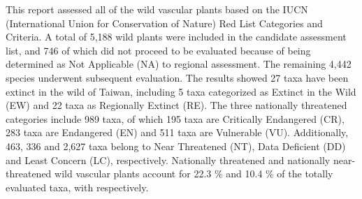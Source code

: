 
This report assessed all of the wild vascular plants based on the
IUCN (International Union for Conservation of Nature) Red List Categories and Criteria.
A total of 5,188 wild plants were included in the candidate assessment list,
and 746 of which did not proceed to be evaluated because of being determined 
as Not Applicable (NA) to regional assessment. The remaining 4,442 species underwent 
subsequent evaluation. The results showed 27 taxa have been extinct in the wild of Taiwan,
including 5 taxa categorized as Extinct in the Wild (EW) and 22 taxa as 
Regionally Extinct (RE). The three nationally threatened categories include 989 taxa, 
of which 195 taxa are Critically Endangered (CR), 283 taxa are Endangered (EN) 
and 511 taxa are Vulnerable (VU). Additionally, 463, 336 and 2,627 taxa belong to Near Threatened (NT), 
Data Deficient (DD) and Least Concern (LC), respectively. Nationally 
threatened and nationally near-threatened wild vascular plants account 
for 22.3 \% and 10.4 \% of the totally evaluated taxa, with respectively.

